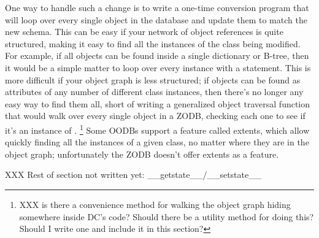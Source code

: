 One way to handle such a change is to write a one-time conversion
program that will loop over every single object in the database and
update them to match the new schema.  This can be easy if your network
of object references is quite structured, making it easy to find all
the instances of the class being modified.  For example, if all
 objects can be found inside a single dictionary or
B-tree, then it would be a simple matter to loop over every
 instance with a  statement.
This is more difficult if your object graph is less structured; if
 objects can be found as attributes of any number of
different class instances, then there's no longer any easy way to find
them all, short of writing a generalized object traversal function
that would walk over every single object in a ZODB, checking each one
to see if it's an instance of .  
\footnote{XXX is there a convenience method for walking the object graph hiding
somewhere inside DC's code?  Should there be a utility method for
doing this?  Should I write one and include it in this section?}
Some OODBs support a feature called extents, which allow quickly
finding all the instances of a given class, no matter where they are
in the object graph; unfortunately the ZODB doesn't offer extents as a
feature.

XXX Rest of section not written yet: __getstate__/__setstate__

